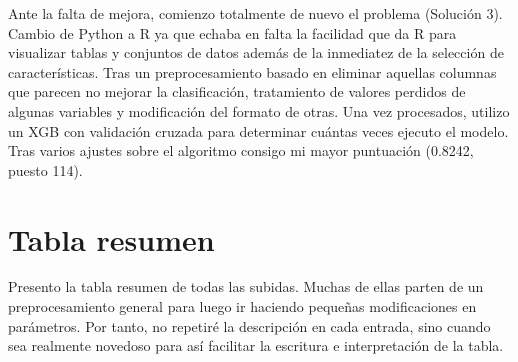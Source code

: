 Ante la falta de mejora, comienzo totalmente de nuevo el problema (Solución 3). Cambio de Python a R ya que echaba en falta la facilidad que da R para visualizar tablas y conjuntos de datos además de la inmediatez de la selección de características. Tras un preprocesamiento basado en eliminar aquellas columnas que parecen no mejorar la clasificación, tratamiento de valores perdidos de algunas variables y modificación del formato de otras. Una vez procesados, utilizo un XGB con validación cruzada para determinar cuántas veces ejecuto el modelo. Tras varios ajustes sobre el algoritmo consigo mi mayor puntuación (0.8242, puesto 114).


\section{Tabla resumen}

Presento la tabla resumen de todas las subidas. Muchas de ellas parten de un preprocesamiento general para luego ir haciendo pequeñas modificaciones en parámetros. Por tanto, no repetiré la descripción en cada entrada, sino cuando sea realmente novedoso para así facilitar la escritura e interpretación de la tabla. 


